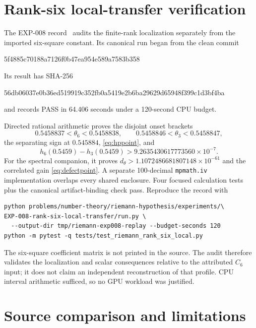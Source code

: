 ﻿\documentclass[11pt]{article}
\theoremstyle{remark}
\begin{document}
\section{Rank-six local-transfer verification}

The EXP-008 record~\cite{RecordVIII} audits the finite-rank localization
separately from the imported six-square constant. Its canonical run began from
the clean commit
\begin{center}\small\ttfamily
5f4885c70188a7126f0b47ea954e589a7583b358
\end{center}
Its result has SHA-256
\begin{center}\small\ttfamily
56db06037e0b36ed519919c352fb0a5419e2b6ba29629d65948f399c1d3bf4ba
\end{center}
and records PASS in 64.406 seconds under a 120-second CPU budget.

Directed rational arithmetic proves the disjoint onset brackets
\[
 0.5458837<\theta_6<0.5458838,
 \qquad 0.5458846<\theta_3<0.5458847,
\]
the separating sign at $0.545884$, \eqref{eq:hppoint}, and
\[
 h_6(0.5459)-h_3(0.5459)>
 9.2635430617773560\times10^{-7}.
\]
For the spectral companion, it proves
$d_\theta>1.1072486681807148\times10^{-61}$ and the correlated gain
\eqref{eq:defectpoint}. A separate 100-decimal \texttt{mpmath.iv}
implementation overlaps every shared enclosure. Four focused calculation
tests plus the canonical artifact-binding check pass. Reproduce the record with
\begin{verbatim}
python problems/number-theory/riemann-hypothesis/experiments/\
EXP-008-rank-six-local-transfer/run.py \
  --output-dir tmp/riemann-exp008-replay --budget-seconds 120
python -m pytest -q tests/test_riemann_rank_six_local.py
\end{verbatim}
The six-square coefficient matrix is not printed in the source. The audit
therefore validates the localization and scalar consequences relative to the
attributed $C_6$ input; it does not claim an independent reconstruction of that
profile. CPU interval arithmetic sufficed, so no GPU workload was justified.

\section{Source comparison and limitations}
\end{document}
